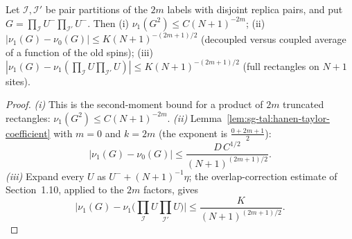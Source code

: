 \begin{lemma}\label{lem:sg-tal:hanen-trunc-comparison}
\leanok
{}
Let $\mathcal I,\mathcal I'$ be pair partitions of the $2m$ labels with disjoint replica pairs, and put
$G=\prod_{\mathcal I}U^-\prod_{\mathcal I'}U^-$. Then (i) $\nu_1(G^2)\le C(N+1)^{-2m}$;
(ii) $|\nu_1(G)-\nu_0(G)|\le K(N+1)^{-(2m+1)/2}$ (decoupled versus coupled average of a function of the old spins);
(iii) $|\nu_1(G)-\nu_1(\prod_{\mathcal I}U\prod_{\mathcal I'}U)|\le K(N+1)^{-(2m+1)/2}$ (full rectangles on $N+1$ sites).
\end{lemma}
\begin{proof}
\leanok
\emph{(i)} This is the second-moment bound for a product of $2m$ truncated rectangles: $\nu_1(G^2)\le C(N+1)^{-2m}$.
\emph{(ii)} Lemma~\ref{lem:sg-tal:hanen-taylor-coefficient} with $m=0$ and $k=2m$ (the exponent is $\frac{0+2m+1}2$):
\[
|\nu_1(G)-\nu_0(G)|\le\frac{D\,C^{1/2}}{(N+1)^{(2m+1)/2}} .
\]
\emph{(iii)} Expand every $U$ as $U^-+(N+1)^{-1}\eta$; the overlap-correction estimate of Section~1.10, applied to the $2m$ factors, gives
\[
\Big|\nu_1(G)-\nu_1\Big(\prod_{\mathcal I}U\prod_{\mathcal I'}U\Big)\Big|\le\frac K{(N+1)^{(2m+1)/2}} .
\]
\end{proof}

